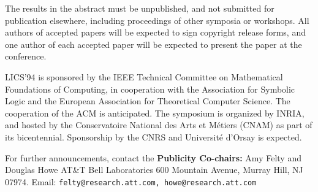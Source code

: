 \begin{minipage}[t]{4.5in}
The results in the abstract must be unpublished, and not submitted
for publication elsewhere, including proceedings of other symposia or
workshops.  All authors of accepted papers will be expected to sign
copyright release forms, and one author of each accepted paper will be
expected to present the paper at the conference.

LICS'94 is sponsored by the IEEE Technical Committee on
Mathematical Foundations of Computing, in cooperation with the
Association for Symbolic Logic and the European Association for
Theoretical Computer Science.  The cooperation of the ACM is anticipated.
The symposium is organized by INRIA, and hosted by 
the Conservatoire National des Arts et M\'etiers (CNAM) as part of 
its bicentennial.
Sponsorship by the CNRS and Universit\'e d'Orsay is expected.

For further announcements, contact the
{\bf Publicity Co-chairs:}
Amy Felty and Douglas Howe
AT\&T Bell Laboratories
600 Mountain Avenue,
Murray Hill, NJ 07974.
Email: {\tt felty@research.att.com, howe@research.att.com}
\end{minipage}

